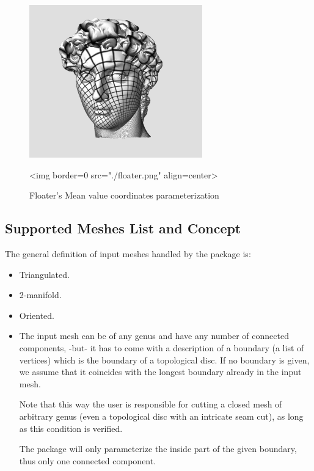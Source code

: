 \begin{figure}[bht]
    \begin{center}
        \begin{ccTexOnly}
            \includegraphics{Parameterization/floater} %
        \end{ccTexOnly}
        \begin{ccHtmlOnly}
            <img border=0 src="./floater.png" align=center>
        \end{ccHtmlOnly}
        \label{parameterization-fig-floater}

        \caption{Floater's Mean value coordinates parameterization}
    \end{center}
\end{figure}


\subsection{Supported Meshes List and Concept}

The general definition of input meshes handled by the package is:

\begin{itemize}

\item Triangulated.

\item 2-manifold.

\item Oriented.

\item The input mesh can be of any genus and have any number of connected components,
-but- it has to come with a description of a boundary (a list of
vertices) which is the boundary of
a topological disc. If no boundary is given, we assume that it
coincides with the longest boundary already in the input mesh.

Note that this way the user is responsible for cutting a closed mesh of
arbitrary genus (even a topological disc with an intricate seam
cut), as long as this condition is verified.

The package will only parameterize the inside part of the given boundary,
thus only one connected component.

\end{itemize}

